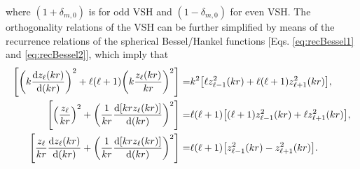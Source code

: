 %
where $(1+\delta_{m,0}) $ is for odd VSH and $(1-\delta_{m,0}) $ for even VSH. The orthogonality relations of the VSH can be further simplified by means of the recurrence relations of the spherical Bessel/Hankel functions [Eqs. \eqref{eq:recBessel1} and \eqref{eq:recBessel2}], which imply that
%
\begin{align}
\qty[\qty(k\dv{z_\ell(kr)}{(kr)})^2 + \ell(\ell+1)\qty(k\frac{z_\ell(kr)}{kr})^2] =& k^2
		\qty[\ell z_{\ell-1}^2(kr) + \ell(\ell+1)z_{\ell+1}^2(kr)],\\
\qty[\qty(\frac{ z_{\ell}}{kr})^2 + \qty(\frac{1}{kr}\dv{[kr z_\ell(kr)]}{(kr)})^2] =&
 	\ell(\ell+1)\qty[(\ell+1) z_{\ell-1}^2(kr)+ \ell z_{\ell+1}^2(kr)],  \\
\qty[\frac{ z_{\ell}}{kr}\dv{z_\ell(kr)}{(kr)} + \qty(\frac{1}{kr}\dv{[kr z_\ell(kr)]}{(kr)})^2] =&
	 	\ell(\ell+1)\qty[z_{\ell-1}^2(kr)- z_{\ell+1}^2(kr)].
\end{align}
%
